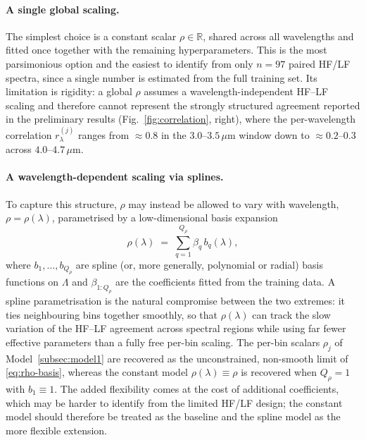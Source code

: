 \documentclass[11pt,a4paper]{article}
\begin{document}
\paragraph{A single global scaling.}
The simplest choice is a constant scalar $\rho\in\mathbb{R}$, shared across
all wavelengths and fitted once together with the remaining
hyperparameters. This is the most parsimonious option and the easiest to
identify from only $n=97$ paired HF/LF spectra, since a single number is
estimated from the full training set. Its limitation is rigidity: a global
$\rho$ assumes a wavelength-independent HF--LF scaling and therefore cannot
represent the strongly structured agreement reported in
the preliminary results (Fig.~\ref{fig:correlation}, right), where the
per-wavelength correlation $r^{(j)}_\lambda$ ranges from $\approx0.8$ in the
$3.0$--$3.5\,\mu$m window down to $\approx0.2$--$0.3$ across
$4.0$--$4.7\,\mu$m.

\paragraph{A wavelength-dependent scaling via splines.}
To capture this structure, $\rho$ may instead be allowed to vary with
wavelength, $\rho=\rho(\lambda)$, parametrised by a low-dimensional basis
expansion
\[
    \rho(\lambda)
    \;=\;
    \sum_{q=1}^{Q_\rho}
    \beta_q\,b_q(\lambda),
    \label{eq:rho-basis}
\]
where $b_1,\ldots,b_{Q_\rho}$ are spline (or, more generally, polynomial or
radial) basis functions on $\Lambda$ and $\beta_{1:Q_\rho}$ are the
coefficients fitted from the training data. A spline parametrisation is the
natural compromise between the two extremes: it ties neighbouring bins
together smoothly, so that $\rho(\lambda)$ can track the slow variation of
the HF--LF agreement across spectral regions while using far fewer effective
parameters than a fully free per-bin scaling. The per-bin scalars $\rho_j$
of Model~\ref{subsec:model1} are recovered as the unconstrained,
non-smooth limit of \eqref{eq:rho-basis}, whereas the constant model
$\rho(\lambda)\equiv\rho$ is recovered when $Q_\rho=1$ with $b_1\equiv1$.
The added flexibility comes at the cost of additional coefficients, which
may be harder to identify from the limited HF/LF design; the constant model
should therefore be treated as the baseline and the spline model as the more
flexible extension.

\end{document}
